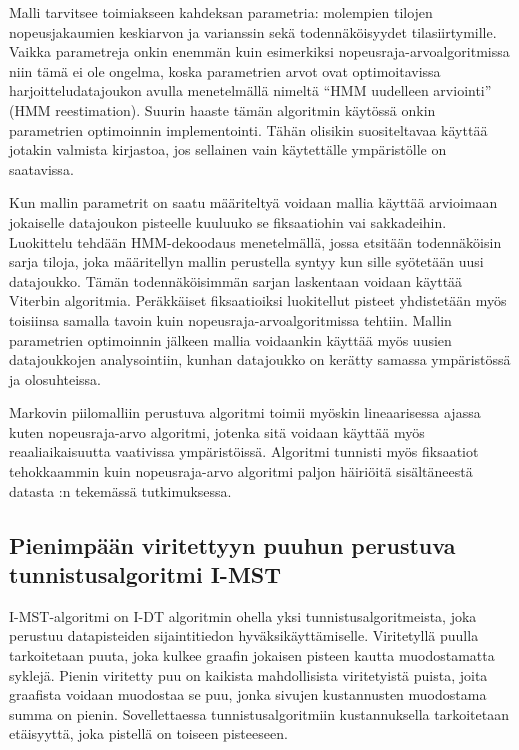 Malli tarvitsee toimiakseen kahdeksan parametria: molempien tilojen nopeusjakaumien keskiarvon ja varianssin sekä todennäköisyydet tilasiirtymille. Vaikka parametreja onkin enemmän kuin esimerkiksi nopeusraja-arvoalgoritmissa niin tämä ei ole ongelma, koska parametrien arvot ovat optimoitavissa harjoitteludatajoukon avulla menetelmällä nimeltä ``HMM uudelleen arviointi'' (HMM reestimation).\citep[s. 180]{salvucci1999} Suurin haaste tämän algoritmin käytössä onkin parametrien optimoinnin implementointi. Tähän olisikin suositeltavaa käyttää jotakin valmista kirjastoa, jos sellainen vain käytettälle ympäristölle on saatavissa.

Kun mallin parametrit on saatu määriteltyä voidaan mallia käyttää arvioimaan jokaiselle datajoukon pisteelle kuuluuko se fiksaatiohin vai sakkadeihin. Luokittelu tehdään HMM-dekoodaus menetelmällä, jossa etsitään todennäköisin sarja tiloja, joka määritellyn mallin perustella syntyy kun sille syötetään uusi datajoukko. Tämän todennäköisimmän sarjan laskentaan voidaan käyttää Viterbin algoritmia.\citep[s. 178]{salvucci1999}  Peräkkäiset fiksaatioiksi luokitellut pisteet yhdistetään myös toisiinsa samalla tavoin kuin nopeusraja-arvoalgoritmissa tehtiin.\citep[s. 31]{salvucci1999} Mallin parametrien optimoinnin jälkeen mallia voidaankin käyttää myös uusien datajoukkojen analysointiin, kunhan datajoukko on kerätty samassa ympäristössä ja olosuhteissa.

Markovin piilomalliin perustuva algoritmi toimii myöskin lineaarisessa ajassa kuten nopeusraja-arvo algoritmi, jotenka sitä voidaan käyttää myös reaaliaikaisuutta vaativissa ympäristöissä. Algoritmi tunnisti myös fiksaatiot tehokkaammin kuin nopeusraja-arvo algoritmi paljon häiriöitä sisältäneestä datasta \citet[s. 32]{salvucci1999}:n tekemässä tutkimuksessa.

\subsection{Pienimpään viritettyyn puuhun perustuva tunnistusalgoritmi I-MST}
I-MST-algoritmi on I-DT algoritmin ohella yksi tunnistusalgoritmeista, joka perustuu datapisteiden sijaintitiedon hyväksikäyttämiselle. Viritetyllä puulla tarkoitetaan puuta, joka kulkee graafin jokaisen pisteen kautta muodostamatta syklejä. Pienin viritetty puu on kaikista mahdollisista viritetyistä puista, joita graafista voidaan muodostaa se puu, jonka sivujen kustannusten muodostama summa on pienin. Sovellettaessa tunnistusalgoritmiin kustannuksella tarkoitetaan etäisyyttä, joka pistellä on toiseen pisteeseen.

